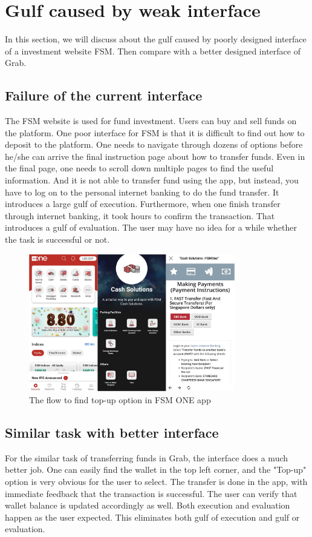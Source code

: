 \documentclass[
	letterpaper, %
]{jdf}
\begin{document}
\section{Gulf caused by weak interface}
In this section, we will discuss about the gulf caused by poorly designed interface of a investment website FSM. Then compare with a better designed interface of Grab.

\subsection{Failure of the current interface}
The FSM website is used for fund investment. Users can buy and sell funds on the platform. One poor interface for FSM is that it is difficult to find out how to deposit to the platform. One needs to navigate through dozens of options before he/she can arrive the final instruction page about how to transfer funds. Even in the final page, one needs to scroll down multiple pages to find the useful information. And it is not able to transfer fund using the app, but instead, you have to log on to the personal internet banking to do the fund transfer. It introduces a large gulf of execution. Furthermore, when one finish transfer through internet banking, it took hours to confirm the transaction. That introduces a gulf of evaluation. The user may have no idea for a while whether the task is successful or not.

\begin{figure}[h]
	\centering
	\includegraphics[height=6cm]{Figures/fsm_one.jpg}
	\caption{The flow to find top-up option in FSM ONE app}
	\label{fig:fsm_one}
\end{figure}

\subsection{Similar task with better interface}
For the similar task of transferring funds in Grab, the interface does a much better job. One can easily find the wallet in the top left corner, and the "Top-up" option is very obvious for the user to select. The transfer is done in the app, with immediate feedback that the transaction is successful. The user can verify that wallet balance is updated accordingly as well. Both execution and evaluation happen as the user expected. This eliminates both gulf of execution and gulf or evaluation.
\end{document}
